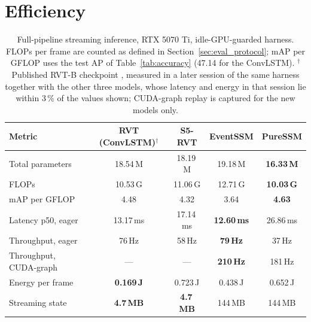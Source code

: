 \documentclass[11pt, a4paper]{report}
\begin{document}
\section{Efficiency}
\label{sec:efficiency}
\begin{table}[htbp]
\centering
\caption{Full-pipeline streaming inference, RTX 5070 Ti, idle-GPU-guarded harness. FLOPs per frame
are counted as defined in Section~\ref{sec:eval_protocol}; mAP per GFLOP uses the test AP of
Table~\ref{tab:accuracy} (47.14 for the ConvLSTM). $^{\dagger}$Published RVT-B checkpoint
\cite{gehrig2023recurrent}, measured in a later session of the same harness together with the other three
models, whose latency and energy in that session lie within 3\,\% of the values shown; CUDA-graph replay is
captured for the new models only.}
\label{tab:efficiency}
\begin{tabular}{lcccc}
\toprule
\textbf{Metric} & \textbf{RVT (ConvLSTM)}$^{\dagger}$ & \textbf{S5-RVT} & \textbf{EventSSM} & \textbf{PureSSM} \\
\midrule
Total parameters       & 18.54\,M & 18.19\,M & 19.18\,M & \textbf{16.33\,M} \\
FLOPs                  & 10.53\,G & 11.06\,G & 12.71\,G & \textbf{10.03\,G} \\
mAP per GFLOP          & 4.48 & 4.32 & 3.64 & \textbf{4.63} \\
Latency p50, eager     & 13.17\,ms & 17.14\,ms & \textbf{12.60\,ms} & 26.86\,ms \\
Throughput, eager      & 76\,Hz & 58\,Hz & \textbf{79\,Hz} & 37\,Hz \\
Throughput, CUDA-graph & --- & --- & \textbf{210\,Hz} & 181\,Hz \\
Energy per frame       & \textbf{0.169\,J} & 0.723\,J & 0.438\,J & 0.652\,J \\
Streaming state        & \textbf{4.7\,MB} & \textbf{4.7\,MB} & 144\,MB & 144\,MB \\
\bottomrule
\end{tabular}
\end{table}
\end{document}
